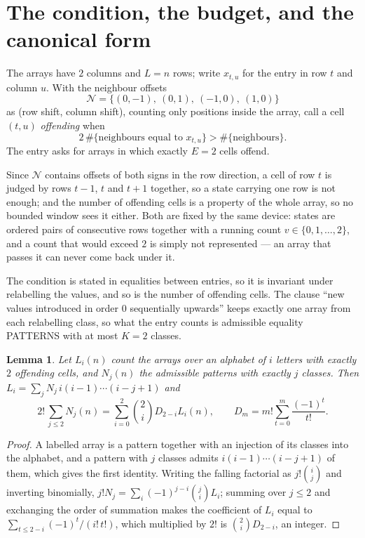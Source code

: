 \documentclass[11pt,a4paper]{article}
\theoremstyle{plain}
\newtheorem{lemma}[theorem]{Lemma}
\theoremstyle{definition}
\begin{document}
\section{The condition, the budget, and the canonical form}

The arrays have $2$ columns and $L=n$ rows; write $x_{t,u}$ for the entry in
row $t$ and column $u$. With the neighbour offsets
\[
\mathcal N=\{(0,-1),\ (0,1),\ (-1,0),\ (1,0)\}
\]
as (row shift, column shift), counting only positions inside the array, call a cell
$(t,u)$ \emph{offending} when
\[
2\,\#\{\text{neighbours equal to }x_{t,u}\}>\#\{\text{neighbours}\} .
\]
The entry asks for arrays in which exactly $E=2$ cells offend.

Since $\mathcal N$ contains offsets of both signs in the row direction, a cell of row
$t$ is judged by rows $t-1$, $t$ and $t+1$ together, so a state carrying one row is not
enough; and the number of offending cells is a property of the whole array, so no bounded
window sees it either. Both are fixed by the same device: states are ordered pairs of
consecutive rows together with a running count $v\in\{0,1,\dots,2\}$, and a count that
would exceed $2$ is simply not represented --- an array that passes it can never come back
under it.

The condition is stated in equalities between entries, so it is invariant under relabelling
the values, and so is the number of offending cells. The clause ``new values introduced in
order $0$ sequentially upwards'' keeps exactly one array from each relabelling class, so what
the entry counts is admissible equality PATTERNS with at most $K=2$ classes.

\begin{lemma}\label{lem:inv}
Let $L_i(n)$ count the arrays over an alphabet of $i$ letters with exactly $2$ offending
cells, and $N_j(n)$ the admissible patterns with exactly $j$ classes. Then
$L_i=\sum_j N_j\,i(i-1)\cdots(i-j+1)$ and
\[
2!\,\sum_{j\le2}N_j(n)=\sum_{i=0}^{2}\binom{2}{i}D_{2-i}L_i(n),
\qquad D_m=m!\sum_{t=0}^{m}\frac{(-1)^t}{t!} .
\]
\end{lemma}

\begin{proof}
A labelled array is a pattern together with an injection of its classes into the alphabet,
and a pattern with $j$ classes admits $i(i-1)\cdots(i-j+1)$ of them, which gives the first
identity. Writing the falling factorial as $j!\binom{i}{j}$ and inverting binomially,
$j!N_j=\sum_i(-1)^{j-i}\binom{j}{i}L_i$; summing over $j\le2$ and exchanging the
order of summation makes the coefficient of $L_i$ equal to
$\sum_{t\le2-i}(-1)^t/(i!\,t!)$, which multiplied by $2!$ is
$\binom{2}{i}D_{2-i}$, an integer.
\end{proof}
\end{document}
